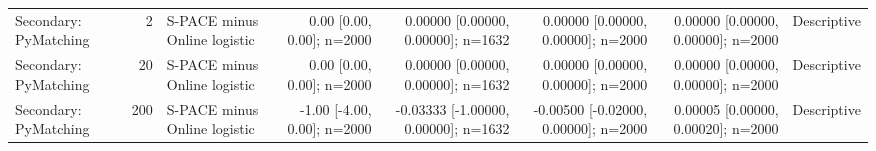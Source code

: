 {\begin{tabular}{lrlrrrrl}
Secondary: PyMatching & 2 & S-PACE minus Online logistic & 0.00 [0.00, 0.00]; n=2000 & 0.00000 [0.00000, 0.00000]; n=1632 & 0.00000 [0.00000, 0.00000]; n=2000 & 0.00000 [0.00000, 0.00000]; n=2000 & Descriptive \\
Secondary: PyMatching & 20 & S-PACE minus Online logistic & 0.00 [0.00, 0.00]; n=2000 & 0.00000 [0.00000, 0.00000]; n=1632 & 0.00000 [0.00000, 0.00000]; n=2000 & 0.00000 [0.00000, 0.00000]; n=2000 & Descriptive \\
Secondary: PyMatching & 200 & S-PACE minus Online logistic & -1.00 [-4.00, 0.00]; n=2000 & -0.03333 [-1.00000, 0.00000]; n=1632 & -0.00500 [-0.02000, 0.00000]; n=2000 & 0.00005 [0.00000, 0.00020]; n=2000 & Descriptive \\
\bottomrule
\end{tabular}
}
\par
